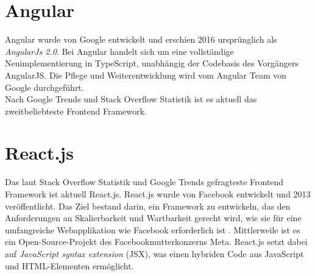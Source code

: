 \section{Angular}
Angular wurde von Google entwickelt und erschien 2016 ursprünglich als \emph{AngularJs 2.0}.
Bei Angular handelt sich um eine vollständige Neuimplementierung in TypeScript, unabhängig der Codebasis des Vorgängers AngularJS.
Die Pflege und Weiterentwicklung wird vom Angular Team von Google durchgeführt. \cite[S. 209-210]{bin2019}
\\
Nach Google Trends \cite{googleTrends} und Stack Overflow Statistik  \cite{stackoverflowStats} ist es aktuell das zweitbeliebteste
Frontend Framework.


\section{React.js}
Das laut Stack Overflow Statistik \cite{stackoverflowStats} und Google Trends \cite{googleTrends} gefragteste Frontend Framework ist aktuell React.js.
React.js wurde von Facebook entwickelt und 2013 veröffentlicht.
Das Ziel bestand darin, ein Framework zu entwickeln,
das den Anforderungen an Skalierbarkeit und Wartbarkeit gerecht wird,
wie sie für eine umfangreiche Webapplikation wie Facebook erforderlich ist \cite[S. 1]{gackenheimer2015introduction}.
Mittlerweile ist es ein Open-Source-Projekt des Facebookmutterkonzerns Meta.
React.js setzt dabei auf \emph{JavaScript syntax extension} (JSX), was einen hybriden Code aus JavaScript und HTML-Elementen ermöglicht. \cite{react}


